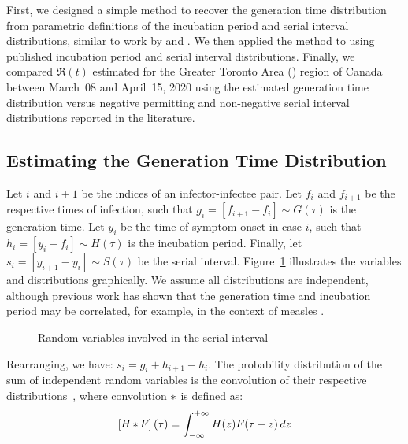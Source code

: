First, we designed a simple method to
recover the generation time distribution
from parametric definitions of
the incubation period and serial interval distributions,
similar to work by \textcite{Kuk2005} and \textcite{Britton2019}.
We then applied the method to \covid using
published incubation period and serial interval distributions.
Finally, we compared $\Re(t)$ estimated for
the Greater Toronto Area (\gta) region of Canada
between March~08 and April~15, 2020 using
the estimated generation time distribution versus
negative permitting and non-negative serial interval distributions
reported in the literature.
\subsection{Estimating the Generation Time Distribution}
Let $i$ and $i+1$ be the indices of an infector-infectee pair.
Let $f_i$ and $f_{i+1}$ be the respective times of infection,
such that $g_i = [f_{i+1} - f_i] \sim G(\tau)$ is the generation time.
Let $y_i$ be the time of symptom onset in case $i$,
such that $h_i = [y_i - f_i] \sim H(\tau)$ is the incubation period.
Finally, let $s_i = [y_{i+1} - y_i] \sim S(\tau)$ be the serial interval.
Figure~\ref{fig:nodes} illustrates the variables and distributions graphically.
We assume all distributions are independent,
although previous work has shown that
the generation time and incubation period may be correlated,
for example, in the context of measles \cite{Klinkenberg2011}.
\par
\begin{figure}
  \centering
  
  \caption{Random variables involved in the serial interval}
  \label{fig:nodes}
\end{figure}
\par
Rearranging, we have:
$s_i = g_i + h_{i+1} - h_i$.
The probability distribution of
the sum of independent random variables
is the convolution of their respective distributions~\cite{Hogg2005},
where convolution $\mathop{\ast}$ is defined as:
\begin{equation}\label{eq:conv}
  \left[H \mathop{\ast} F\right](\tau) = \int_{-\infty}^{+\infty} H(z) F(\tau - z) \,dz
\end{equation}
